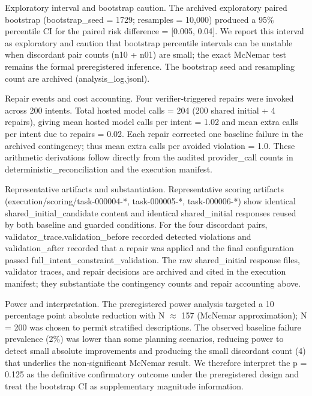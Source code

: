 \documentclass[conference]{IEEEtran}
\begin{document}
Exploratory interval and bootstrap caution. The archived exploratory paired bootstrap (bootstrap\_seed = 1729; resamples = 10,000) produced a 95\% percentile CI for the paired risk difference = [0.005, 0.04]. We report this interval as exploratory and caution that bootstrap percentile intervals can be unstable when discordant pair counts (n10 + n01) are small; the exact McNemar test remains the formal preregistered inference. The bootstrap seed and resampling count are archived (analysis\_log.jsonl).

Repair events and cost accounting. Four verifier‑triggered repairs were invoked across 200 intents. Total hosted model calls = 204 (200 shared initial + 4 repairs), giving mean hosted model calls per intent = 1.02 and mean extra calls per intent due to repairs = 0.02. Each repair corrected one baseline failure in the archived contingency; thus mean extra calls per avoided violation = 1.0. These arithmetic derivations follow directly from the audited provider\_call counts in deterministic\_reconciliation and the execution manifest.

Representative artifacts and substantiation. Representative scoring artifacts (execution/scoring/task-000004-*, task-000005-*, task-000006-*) show identical shared\_initial\_candidate content and identical shared\_initial responses reused by both baseline and guarded conditions. For the four discordant pairs, validator\_trace.validation\_before recorded detected violations and validation\_after recorded that a repair was applied and the final configuration passed full\_intent\_constraint\_validation. The raw shared\_initial response files, validator traces, and repair decisions are archived and cited in the execution manifest; they substantiate the contingency counts and repair accounting above.

Power and interpretation. The preregistered power analysis targeted a 10 percentage point absolute reduction with N \ensuremath{\approx} 157 (McNemar approximation); N = 200 was chosen to permit stratified descriptions. The observed baseline failure prevalence (2\%) was lower than some planning scenarios, reducing power to detect small absolute improvements and producing the small discordant count (4) that underlies the non‑significant McNemar result. We therefore interpret the p = 0.125 as the definitive confirmatory outcome under the preregistered design and treat the bootstrap CI as supplementary magnitude information.
\end{document}

